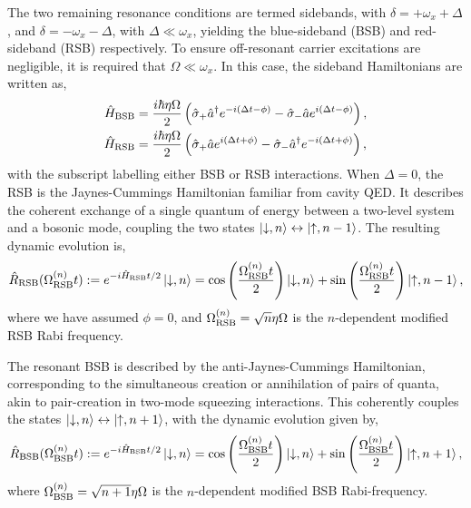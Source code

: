 The two remaining resonance conditions are termed sidebands, with $\delta = +\omega_x + \Delta $, and $\delta = -\omega_x - \Delta$, with $\Delta \ll \omega_x$, yielding the blue-sideband (BSB) and red-sideband (RSB) respectively.
To ensure off-resonant carrier excitations are negligible, it is required that $\Omega \ll \omega_x$.
In this case, the sideband Hamiltonians are written as,
\begin{subequations}
\begin{align}
    \hat H_{\rm BSB} &= \frac{i\hbar \eta\Omega}{2}\left( \hat\sigma_+\hat a^\dagger e^{-i(\Delta t-\phi)} - \hat\sigma_-\hat a e^{i(\Delta t -\phi)}\right),\\
    \hat H_{\rm RSB} &= \frac{i\hbar \eta\Omega}{2}\left(\hat\sigma_+\hat a e^{i(\Delta t + \phi)} - \hat\sigma_-\hat a^\dagger e^{-i(\Delta t +\phi)}\right),
\end{align}
\end{subequations}
with the subscript labelling either BSB or RSB interactions.
When $\Delta = 0$, the RSB is the Jaynes-Cummings Hamiltonian
familiar from cavity QED. It describes the coherent exchange of a single quantum of energy between a two-level system
and a bosonic mode, coupling the two states $\ket{\downarrow,n}\leftrightarrow\ket{\uparrow,n-1}$. The resulting dynamic evolution is,
\begin{equation}
\hat R_{\rm RSB}(\Omega^{(n)}_{\rm RSB}t) :=e^{-i\hat H_{\rm RSB}t/2}\ket{\downarrow, n} = \cos\left(\frac{\Omega^{(n)}_{\rm RSB}t}{2}\right)\ket{\downarrow,n} + \sin\left(\frac{\Omega^{(n)}_{\rm RSB}t}{2}\right)\ket{\uparrow,n-1},
\end{equation}
where we have assumed $\phi=0$, and $\Omega^{(n)}_{\rm RSB} = \sqrt{n}\eta\Omega$ is the $n$-dependent modified RSB Rabi frequency.

The resonant BSB is described by the anti-Jaynes-Cummings Hamiltonian, corresponding to the simultaneous creation or annihilation of pairs of quanta, akin to pair-creation in two-mode squeezing interactions. This coherently couples the states $\ket{\downarrow,n}\leftrightarrow\ket{\uparrow,n+1}$, with the dynamic evolution given by,
\begin{equation}
\hat R_{\rm BSB}(\Omega^{(n)}_{\rm BSB}t) := e^{-i\hat H_{\rm BSB}t/2}\ket{\downarrow, n} = \cos\left(\frac{\Omega^{(n)}_{\rm BSB}t}{2}\right)\ket{\downarrow,n} + \sin\left(\frac{\Omega^{(n)}_{\rm BSB}t}{2}\right)\ket{\uparrow,n+1},
\end{equation}
where $\Omega^{(n)}_{\rm BSB} = \sqrt{n+1}\eta\Omega$ is the $n$-dependent modified BSB Rabi-frequency.

